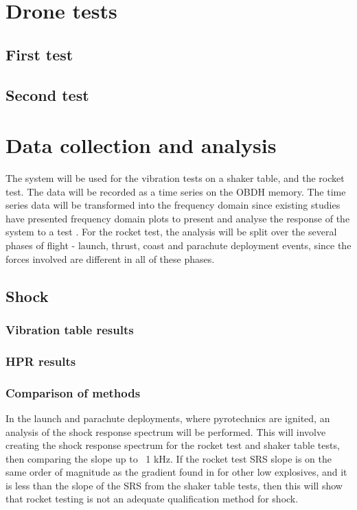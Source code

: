 \documentclass[a4paper,11pt]{article}
\begin{document}
\section{Drone tests}
\subsection{First test}
\subsection{Second test}


\section{Data collection and analysis}

The system will be used for the vibration tests on a shaker table, and the rocket test. The data will be recorded as a time series on the OBDH memory. The time series data will be transformed into the frequency domain since existing studies have presented frequency domain plots to present and analyse the response of the system to a test \cite{nasa-pyroshock,nieto2019cubesat}. For the rocket test, the analysis will be split over the several phases of flight - launch, thrust, coast and parachute deployment events, since the forces involved are different in all of these phases.

\subsection{Shock}
\subsubsection{Vibration table results}
\subsubsection{HPR results}
\subsubsection{Comparison of methods}
In the launch and parachute deployments, where pyrotechnics are ignited, an analysis of the shock response spectrum will be performed. This will involve creating the shock response spectrum for the rocket test and shaker table tests, then comparing the slope up to ~1 kHz. If the rocket test SRS slope is on the same order of magnitude as the gradient found in \cite{wang2023numerical} for other low explosives, and it is less than the slope of the SRS from the shaker table tests, then this will show that rocket testing is not an adequate qualification method for shock.
\end{document}
